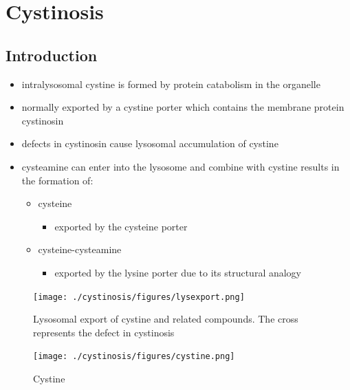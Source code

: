 \documentclass{scrartcl}
\begin{document}
\section{Cystinosis}
\label{sec:org568e2a7}
\subsection{Introduction}
\label{sec:orgedb2204}
\begin{itemize}
\item intralysosomal cystine is formed by protein catabolism in the organelle
\item normally exported by a cystine porter which contains the membrane protein cystinosin
\item defects in cystinosin cause lysosomal accumulation of cystine
\item cysteamine can enter into the lysosome and combine with cystine results in the formation of:
\begin{itemize}
\item cysteine
\begin{itemize}
\item exported by the cysteine porter
\end{itemize}
\item cysteine-cysteamine
\begin{itemize}
\item exported by the lysine porter due to its structural analogy
\end{itemize}
\end{itemize}
\end{itemize}

\begin{figure}[htbp]
\centering
\texttt{[image: ./cystinosis/figures/lysexport.png]}
\caption{\label{fig:org441875d}
Lysosomal export of cystine and related compounds. The cross represents the defect in cystinosis}
\end{figure}

\begin{figure}[htbp]
\centering
\texttt{[image: ./cystinosis/figures/cystine.png]}
\caption{\label{fig:orgea78913}
Cystine}
\end{figure}
\end{document}
